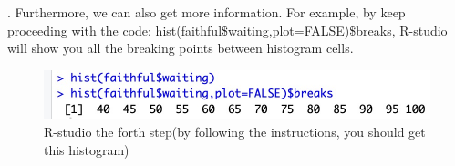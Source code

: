 . Furthermore, we can also get more information. For example, by keep proceeding with the code: hist(faithful\$waiting,plot=FALSE)\$breaks, R-studio will show you all the breaking points between histogram cells.

\begin{figure}[H]
 \centering
 \includegraphics[scale=0.45]{Section1/img/R2.jpg}
 \caption{R-studio the forth step(by following the instructions, you should get this histogram)}
 \end{figure}
